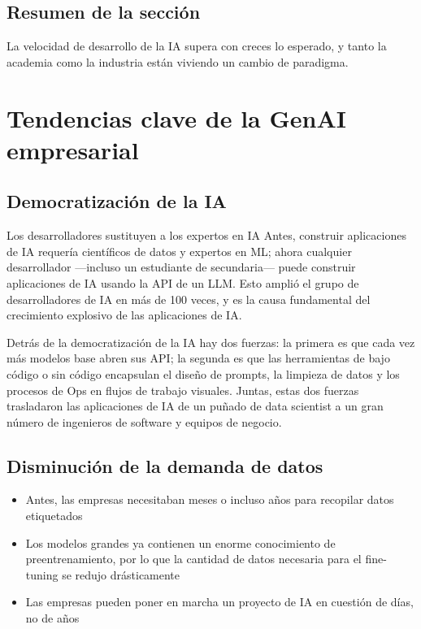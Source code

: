 \documentclass[a4paper]{article}
\begin{document}
\subsection{Resumen de la sección}

La velocidad de desarrollo de la IA supera con creces lo esperado, y tanto la academia como la industria están viviendo un cambio de paradigma.

\section{Tendencias clave de la GenAI empresarial}

\subsection{Democratización de la IA}

\begin{importantbox}{Los desarrolladores sustituyen a los expertos en IA}
Antes, construir aplicaciones de IA requería científicos de datos y expertos en ML; ahora cualquier desarrollador —incluso un estudiante de secundaria— puede construir aplicaciones de IA usando la API de un LLM. Esto amplió el grupo de desarrolladores de IA en más de 100 veces, y es la causa fundamental del crecimiento explosivo de las aplicaciones de IA.
\end{importantbox}

Detrás de la democratización de la IA hay dos fuerzas: la primera es que cada vez más modelos base abren sus API; la segunda es que las herramientas de bajo código o sin código encapsulan el diseño de prompts, la limpieza de datos y los procesos de Ops en flujos de trabajo visuales. Juntas, estas dos fuerzas trasladaron las aplicaciones de IA de un puñado de data scientist a un gran número de ingenieros de software y equipos de negocio.

\subsection{Disminución de la demanda de datos}

\begin{itemize}
    \item Antes, las empresas necesitaban meses o incluso años para recopilar datos etiquetados
    \item Los modelos grandes ya contienen un enorme conocimiento de preentrenamiento, por lo que la cantidad de datos necesaria para el fine-tuning se redujo drásticamente
    \item Las empresas pueden poner en marcha un proyecto de IA en cuestión de días, no de años
\end{itemize}
\end{document}
